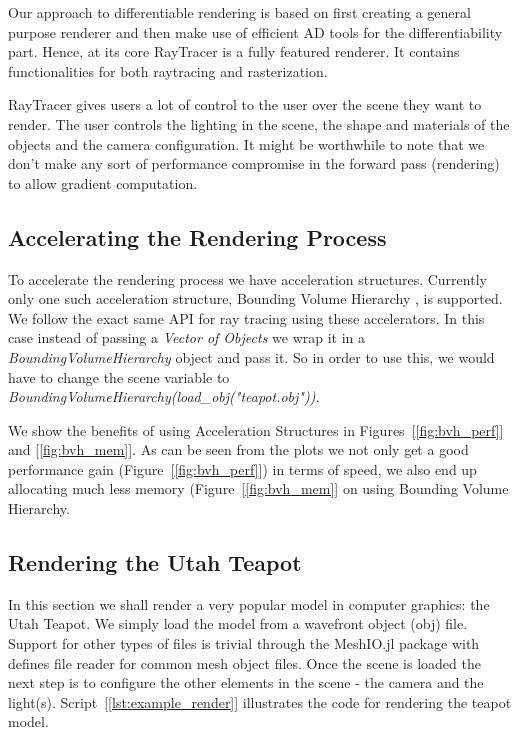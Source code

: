 \documentclass{juliacon}
\begin{document}
Our approach to differentiable rendering is based on first creating a general purpose renderer and then make use of efficient AD tools for the differentiability part. Hence, at its core RayTracer is a fully featured renderer. It contains functionalities for both raytracing and rasterization.

RayTracer gives users a lot of control to the user over the scene they want to render. The user controls the lighting in the scene, the shape and materials of the objects and the camera configuration. It might be worthwhile to note that we don't make any sort of performance compromise in the forward pass (rendering) to allow gradient computation.

\subsection{Accelerating the Rendering Process}

To accelerate the rendering process we have acceleration structures. Currently only one such acceleration structure, Bounding Volume Hierarchy \cite{Kay:1986:RTC:15922.15916}, is supported. We follow the exact same API for ray tracing using these accelerators. In this case instead of passing a \textit{Vector of Objects} we wrap it in a \textit{BoundingVolumeHierarchy} object and pass it. So in order to use this, we would have to change the scene variable to \textit{BoundingVolumeHierarchy(load\_obj("teapot.obj"))}.

We show the benefits of using Acceleration Structures in Figures~[\ref{fig:bvh_perf}] and [\ref{fig:bvh_mem}]. As can be seen from the plots we not only get a good performance gain (Figure~[\ref{fig:bvh_perf}]) in terms of speed, we also end up allocating much less memory (Figure~[\ref{fig:bvh_mem}] on using Bounding Volume Hierarchy.

\subsection{Rendering the Utah Teapot}

In this section we shall render a very popular model in computer graphics: the Utah Teapot. We simply load the model from a wavefront object (obj) file. Support for other types of files is trivial through the MeshIO.jl package with defines file reader for common mesh object files. Once the scene is loaded the next step is to configure the other elements in the scene - the camera and the light(s). Script~[\ref{lst:example_render}] illustrates the code for rendering the teapot model.
\end{document}
